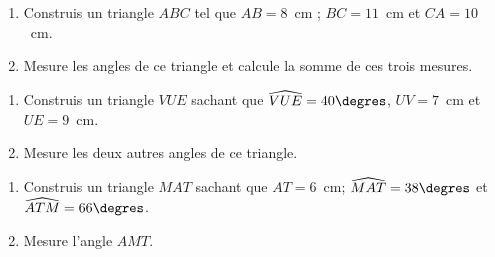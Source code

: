 \begin{myenumerate}
\item
\begin{enumerate}
\item Construis un triangle $ABC$ tel que $AB=8$~cm ; $BC=11$~cm et
$CA=10$~cm.
\item Mesure les angles de ce triangle et calcule la somme de ces
trois mesures.
\end{enumerate}
\item
\begin{enumerate}
\item Construis un triangle $VUE$ sachant que
$\widehat{VUE}=40\degres$, $UV=7$~cm et $UE=9$~cm.
\item Mesure les deux autres angles de ce triangle.
\end{enumerate}
\item
\begin{enumerate}
\item Construis un triangle $MAT$ sachant que $AT=6$~cm;
$\widehat{MAT}=38\degres$ et $\widehat{ATM}=66\degres$.
\item Mesure l'angle $\widehat{AMT}$.
\end{enumerate}
\end{myenumerate}

